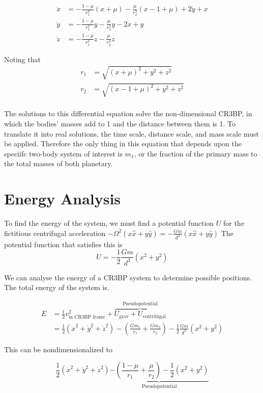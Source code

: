 \documentclass{article}
\begin{document}
\[\boxed{\begin{aligned}
    \ddot{x}&=-\frac{1-\mu}{r_1^3}(x+\mu)-\frac{\mu}{r_2^3}(x-1+\mu)+2\dot{y}+x\\
    \ddot{y}&=-\frac{1-\mu}{r_1^3}y-\frac{\mu}{r_2^3}y-2\dot{x}+y\\
    \ddot{z}&=-\frac{1-\mu}{r_1^3}z-\frac{\mu}{r_2^3}z
\end{aligned}}\]

Noting that
\[\boxed{\begin{aligned}
    r_1&=\sqrt{(x+\mu)^2+y^2+z^2}\\
    r_2&=\sqrt{(x-1+\mu)^2+y^2+z^2}\\
\end{aligned}}\]

The solutions to this differential equation solve the non-dimensional CR3BP, in which the bodies' masses add to 1 and the distance between them is 1. To translate it into real solutions, the time scale, distance scale, and mass scale must be applied. Therefore the only thing in this equation that depends upon the speciifc two-body system of interest is $m_1$, or the fraction of the primary mass to the total masses of both planetary.

\section*{Energy Analysis}

To find the energy of the system, we must find a potential function $U$ for the fictitious centrifugal acceleration $-\Omega^2 \left(x\hat{x}+y\hat{y}\right)=-\frac{Gm}{d^3}\left(x\hat{x}+y\hat{y}\right)$ The potential function that satisfies this is
\[U=-\frac{1}{2}\frac{Gm}{d^3}\left(x^2+y^2\right)\]

We can analyse the energy of a CR3BP system to determine possible positions. The total energy of the system is.

\[\begin{aligned}
    E&=\frac{1}{2}v_\text{in CR3BP frame}^2+\overbrace{U_\text{grav}+U_\text{centrifugal}}^\text{Pseudopotential}\\
    &=\frac{1}{2}\left(\dot{x}^2+\dot{y}^2+\dot{z}^2\right)-\left(\frac{Gm_1}{r_1}+\frac{Gm_2}{r_2}\right)-\frac{1}{2}\frac{Gm}{d^3}\left(x^2+y^2\right)
\end{aligned}\]

This can be nondimensionalized to

\[\frac{1}{2}\left(\dot{x}^2+\dot{y}^2+\dot{z}^2\right)\underbrace{-\left(\frac{1-\mu}{r_1}+\frac{\mu}{r_2}\right)-\frac{1}{2}\left(x^2+y^2\right)}_\text{Pseudopotential}\]
\end{document}
